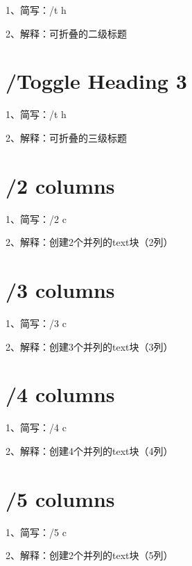 1、简写：/t h

2、解释：可折叠的二级标题

\section{/Toggle Heading 3}

1、简写：/t h

2、解释：可折叠的三级标题

\section{/2 columns}

1、简写：/2 c

2、解释：创建2个并列的text块（2列）

\section{/3 columns}

1、简写：/3 c

2、解释：创建3个并列的text块（3列）

\section{/4 columns}

1、简写：/4 c

2、解释：创建4个并列的text块（4列）

\section{/5 columns}

1、简写：/5 c

2、解释：创建2个并列的text块（5列）

